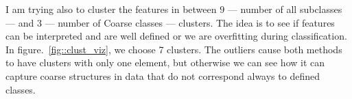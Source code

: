 \documentclass[a4paper, 11pt]{article}
\begin{document}
	I am trying also to cluster the features in between $9$ --- number of all subclasses --- and $3$ --- number of Coarse classes --- clusters. The idea is to see if features can be interpreted and are well defined or we are overfitting during classification. In figure.~\ref{fig::clust_viz}, we choose 7 clusters. The outliers cause both methods to have clusters with only one element, but otherwise we can see how it can capture coarse structures in data that do not correspond always to defined classes.

	\begin{figure}[H]
\end{figure}
\end{document}
